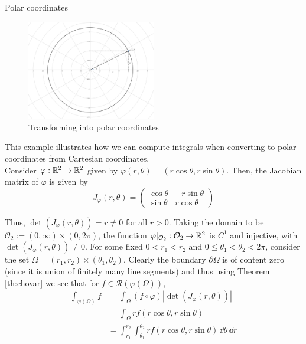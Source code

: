 \documentclass[../Analysis-3.tex]{subfiles}
\begin{document}
\begin{Eg}{Polar coordinates}{}
  \begin{figure}
    \centering
    \includegraphics[width=0.5\textwidth]{../figures/lec21.1.png}
    \caption{Transforming into polar coordinates}
    \label{fig1:21}
  \end{figure}
  This example illustrates how we can compute integrals when converting to polar coordinates from Cartesian coordinates.\\
  Consider $\varphi : \mathbb{R}^2 \to \mathbb{R}^2$ given by $\varphi(r,\theta) = (r \cos\theta, r \sin\theta)$. Then, the Jacobian matrix of $\varphi$ is given by
  \[
    J_{\varphi}(r,\theta) = \begin{pmatrix}
      \cos\theta & -r\sin\theta \\
      \sin\theta & r\cos\theta
    \end{pmatrix}
  \]

  Thus, $\det(J_{\varphi}(r,\theta)) = r \neq 0 $ for all $r>0$. Taking the domain to be $\mathcal{O}_2 := (0,\infty) \times (0,2\pi)$, the function $\varphi\vert_{\mathcal{O}_2} : \mathcal{O}_2 \to \mathbb{R}^2$ is $C^1$ and injective, with $\det(J_{\varphi}(r,\theta)) \neq 0 $. For some fixed $0 < r_1 < r_2$ and $0 \leq \theta_1 < \theta_2 < 2\pi$, consider the set $\Omega = (r_1, r_2) \times (\theta_1, \theta_2)$. Clearly the boundary $\partial \Omega$ is of content zero (since it is union of finitely many line segments) and thus using Theorem \ref{th:chovar} we see that for $f \in \mathscr{R}(\varphi(\Omega))$,
  \begin{align*}
    \int_{\varphi(\Omega)} f
     & = \int_{\Omega} (f \circ \varphi) |\det (J_{\varphi}(r,\theta))|                                 \\
     & = \int_{\Omega} r f(r\cos\theta, r\sin\theta)                                                    \\
     & = \int_{r_1}^{r_2} \int_{\theta_1}^{\theta_2} r f(r\cos\theta, r\sin\theta)\, \dd\theta \, \dd r
  \end{align*}


\end{Eg}
\end{document}
